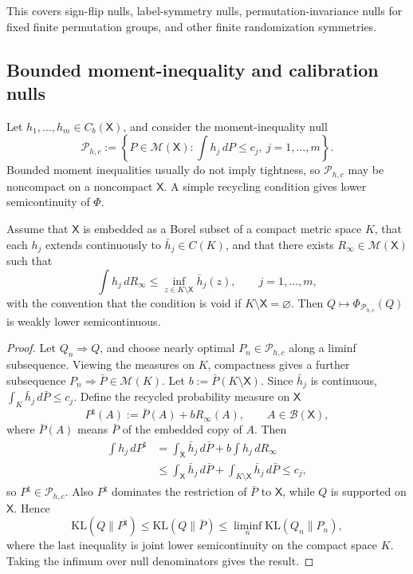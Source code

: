 \documentclass[11pt]{article}
\newcommand{\KL}{\mathrm{KL}}
\newcommand{\Pcal}{\mathcal{P}}
\newcommand{\X}{\mathsf{X}}
\newcommand{\M}{\mathcal{M}}
\theoremstyle{definition}
\theoremstyle{definition}
\begin{document}
This covers sign-flip nulls, label-symmetry nulls, permutation-invariance nulls for fixed finite permutation groups, and other finite randomization symmetries.

\subsection{Bounded moment-inequality and calibration nulls}

Let \(h_1,\ldots,h_m\in C_b(\X)\), and consider the moment-inequality null
\[
  \Pcal_{h,c}:=\left\{P\in\M(\X):\int h_j\,dP\le c_j,\ j=1,\ldots,m\right\}.
\]
Bounded moment inequalities usually do not imply tightness, so \(\Pcal_{h,c}\) may be noncompact on a noncompact \(\X\).  A simple recycling condition gives lower semicontinuity of \(\Phi\).

Assume that \(\X\) is embedded as a Borel subset of a compact metric space \(K\), that each \(h_j\) extends continuously to \(\bar h_j\in C(K)\), and that there exists \(R_\infty\in\M(\X)\) such that
\begin{equation}\label{eq:moment-recycle-condition}
  \int h_j\,dR_\infty
  \le \inf_{z\in K\setminus \X}\bar h_j(z),
  \qquad j=1,\ldots,m,
\end{equation}
with the convention that the condition is void if \(K\setminus\X=\varnothing\).  Then \(Q\mapsto\Phi_{\Pcal_{h,c}}(Q)\) is weakly lower semicontinuous.

\begin{proof}
Let \(Q_n\Rightarrow Q\), and choose nearly optimal \(P_n\in\Pcal_{h,c}\) along a liminf subsequence.  Viewing the measures on \(K\), compactness gives a further subsequence \(P_n\Rightarrow\bar P\in\M(K)\).  Let \(b:=\bar P(K\setminus\X)\).  Since \(\bar h_j\) is continuous,
\(
  \int_K\bar h_j\,d\bar P\le c_j.
\)
Define the recycled probability measure on \(\X\)
\[
  P^\natural(A):=\bar P(A)+bR_\infty(A),
  \qquad A\in\mathcal B(\X),
\]
where \(\bar P(A)\) means \(\bar P\) of the embedded copy of \(A\).  Then
\begin{align*}
  \int h_j\,dP^\natural
  &=\int_\X \bar h_j\,d\bar P+b\int h_j\,dR_\infty\\
  &\le \int_\X \bar h_j\,d\bar P+
       \int_{K\setminus\X}\bar h_j\,d\bar P
   \le c_j,
\end{align*}
so \(P^\natural\in\Pcal_{h,c}\).  Also \(P^\natural\) dominates the restriction of \(\bar P\) to \(\X\), while \(Q\) is supported on \(\X\).  Hence
\[
  \KL(Q\|P^\natural)\le \KL(Q\|\bar P)
  \le \liminf_n\KL(Q_n\|P_n),
\]
where the last inequality is joint lower semicontinuity on the compact space \(K\).  Taking the infimum over null denominators gives the result.
\end{proof}
\end{document}
